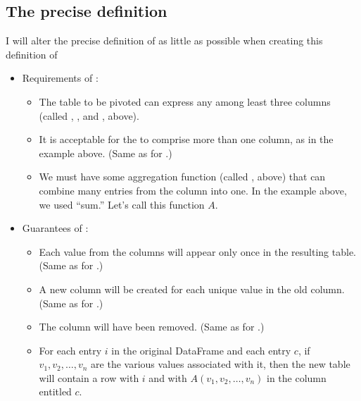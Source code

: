 \documentclass[letterpaper,10pt,english]{jupyterBook}
\begin{document}
\subsection{The precise definition}
\label{\detokenize{chapter-6-single-table-verbs:id3}}
\sphinxAtStartPar
I will alter the precise definition of  as little as possible when creating this definition of 
\begin{itemize}
\item {} 
\sphinxAtStartPar
Requirements of :
\begin{itemize}
\item {} 
\sphinxAtStartPar
The table to be pivoted can express any  among least three columns (called , , and , above).

\item {} 
\sphinxAtStartPar
It is acceptable for the  to comprise more than one column, as in the example above.  (Same as for .)

\item {} 
\sphinxAtStartPar
We must have some aggregation function (called , above) that can combine many entries from the  column into one.  In the example above, we used “sum.”  Let’s call this function \(A\).

\end{itemize}

\item {} 
\sphinxAtStartPar
Guarantees of :
\begin{itemize}
\item {} 
\sphinxAtStartPar
Each value from the  columns will appear only once in the resulting table.  (Same as for .)

\item {} 
\sphinxAtStartPar
A new column will be created for each unique value in the old  column.  (Same as for .)

\item {} 
\sphinxAtStartPar
The  column will have been removed.  (Same as for .)

\item {} 
\sphinxAtStartPar
For each  entry \(i\) in the original DataFrame and each  entry \(c\), if \(v_1,v_2,\ldots,v_n\) are the various values associated with it, then the new table will contain a row with  \(i\) and with \(A(v_1,v_2,\ldots,v_n)\) in the column entitled \(c\).

\end{itemize}

\end{itemize}
\end{document}
